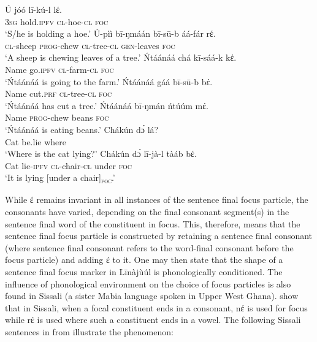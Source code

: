 \documentclass[output=paper,colorlinks,citecolor=brown]{langscibook}
\begin{document}
\ea%
    \label{ex:bisilki:17}
    \ea\label{ex:bisilki:17a}
    \gll    Ú	jóó		lī-kú-l		lέ.\\
            \textsc{3sg}	hold\textsc{.ipfv}	\textsc{cl-}hoe\textsc{-cl}	\textsc{foc}\\
    \glt    ‘S/he is holding a hoe.’
    \ex\label{ex:bisilki:17b}
    \gll    Ú-pìì	bī-ŋmáán	bī-sū-b		áá-fár		rέ.\\
            \textsc{cl-}sheep	\textsc{prog-}chew	\textsc{cl-}tree\textsc{-cl}	\textsc{gen-}leaves	\textsc{foc}\\
    \glt    ‘A sheep is chewing leaves of a tree.’
    \ex\label{ex:bisilki:17c}
    \gll    Ńtáánáá	chá		kī-sáá-k		kέ.\\
            Name		go\textsc{.ipfv}	\textsc{cl-}farm\textsc{-cl}		\textsc{foc}\\
    \glt    ‘Ńtáánáá is going to the farm.’
    \ex\label{ex:bisilki:17d}
    \gll    Ńtáánáá	gáá		bī-sū-b	bέ.\\
            Name		cut\textsc{.prf}	\textsc{cl-}tree\textsc{-cl}	\textsc{foc}\\
    \glt    ‘Ńtáánáá has cut a tree.’
    \ex\label{ex:bisilki:17e}
    \gll    Ńtáánáá	bī-ŋmán	ńtúúm			mέ.\\
            Name		\textsc{prog-}chew	beans			\textsc{foc}\\
    \glt    ‘Ńtáánáá is eating beans.’
    \ex\label{ex:bisilki:17f}
        \ea\label{ex:bisilki:17fi}
        \gll    Chákún	dɔ́		lá?\\
                Cat		be.lie		where\\
        \glt    ‘Where is the cat lying?’
        \ex\label{ex:bisilki:17fii}
        \gll    Chákún	dɔ́		lī-jà-l		tàáb	bέ.\\
            Cat		lie\textsc{-ipfv}	\textsc{cl-}chair\textsc{-cl}	under	\textsc{foc}\\
        \glt    ‘It is lying [under a chair]\textsubscript{\textsc{foc}}.’
        \z
    \z
\z

While έ remains invariant in all instances of the sentence final focus particle, the consonants have varied, depending on the final consonant segment(s) in the sentence final word of the constituent in focus. This, therefore, means that the sentence final focus particle is constructed by retaining a sentence final consonant (where sentence final consonant refers to the word-final consonant before the focus particle) and adding έ to it. One may then state that the shape of a sentence final focus marker in Līnàjùúl is phonologically conditioned. The influence of phonological environment on the choice of focus particles is also found in Sissali (a sister Mabia language spoken in Upper West Ghana). \citet{Dumah2017} show that in Sissali, when a focal constituent ends in a consonant, nέ is used for focus while rέ is used where such a constituent ends in a vowel. The following Sissali sentences in  from \citet{Dumah2017} illustrate the phenomenon:
\end{document}
